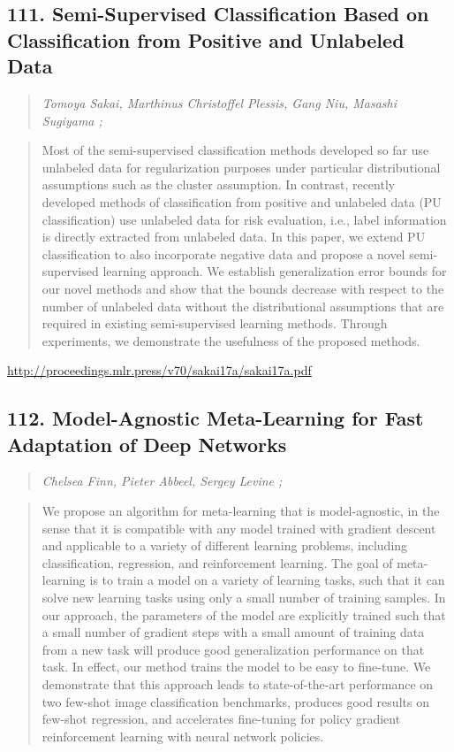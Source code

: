 \documentclass{article}
\begin{document}
\subsection{111. Semi-Supervised Classification Based on Classification from Positive and Unlabeled Data}

\begin{quote}
\footnotesize{\textit{Tomoya Sakai, Marthinus Christoffel Plessis, Gang Niu, Masashi Sugiyama ;}}
\end{quote}

\begin{quote}
    Most of the semi-supervised classification methods developed so far use unlabeled data for regularization purposes under particular distributional assumptions such as the cluster assumption. In contrast, recently developed methods of classification from positive and unlabeled data (PU classification) use unlabeled data for risk evaluation, i.e., label information is directly extracted from unlabeled data. In this paper, we extend PU classification to also incorporate negative data and propose a novel semi-supervised learning approach. We establish generalization error bounds for our novel methods and show that the bounds decrease with respect to the number of unlabeled data without the distributional assumptions that are required in existing semi-supervised learning methods. Through experiments, we demonstrate the usefulness of the proposed methods.  \end{quote}

\href{http://proceedings.mlr.press/v70/sakai17a/sakai17a.pdf}{http://proceedings.mlr.press/v70/sakai17a/sakai17a.pdf}

\subsection{112. Model-Agnostic Meta-Learning for Fast Adaptation of Deep Networks}

\begin{quote}
\footnotesize{\textit{Chelsea Finn, Pieter Abbeel, Sergey Levine ;}}
\end{quote}

\begin{quote}
    We propose an algorithm for meta-learning that is model-agnostic, in the sense that it is compatible with any model trained with gradient descent and applicable to a variety of different learning problems, including classification, regression, and reinforcement learning. The goal of meta-learning is to train a model on a variety of learning tasks, such that it can solve new learning tasks using only a small number of training samples. In our approach, the parameters of the model are explicitly trained such that a small number of gradient steps with a small amount of training data from a new task will produce good generalization performance on that task. In effect, our method trains the model to be easy to fine-tune. We demonstrate that this approach leads to state-of-the-art performance on two few-shot image classification benchmarks, produces good results on few-shot regression, and accelerates fine-tuning for policy gradient reinforcement learning with neural network policies.  \end{quote}
\end{document}
